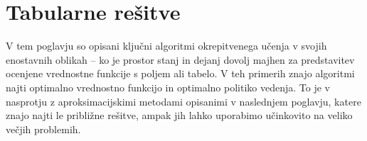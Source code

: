 \documentclass[a4paper, oneside, 12pt]{report}
\begin{document}
\chapter{Tabularne rešitve} \label{chapter:TabularSolutions}
\thispagestyle{fancy}
V tem poglavju so opisani ključni algoritmi okrepitvenega učenja v svojih enostavnih oblikah -- ko je prostor stanj in dejanj dovolj majhen za predstavitev ocenjene vrednostne funkcije s poljem ali tabelo. V teh primerih znajo algoritmi najti optimalno vrednostno funkcijo in optimalno politiko vedenja. To je v nasprotju z aproksimacijskimi metodami opisanimi v naslednjem poglavju, katere znajo najti le približne rešitve, ampak jih lahko uporabimo učinkovito na veliko večjih problemih.
\end{document}
